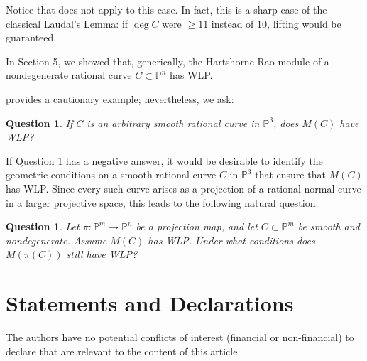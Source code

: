 \documentclass[12pt]{amsart}%
\numberwithin{equation}{section}
\newtheorem{question}[theorem]{Question}
\theoremstyle{definition}
\numberwithin{equation}{section}
\newcommand{\PP}{ \ensuremath{\mathbb{P}}}
\begin{document}
{Notice that  does not apply to this case. In fact, this is a sharp case of the classical Laudal’s Lemma: if $\deg C$ were $\geq 11$ instead of $10$, lifting would be guaranteed. 

In Section 5, we showed that, generically, the Hartshorne-Rao module of a nondegenerate rational curve $C\subset \PP^n$ has WLP. {  provides a cautionary example; nevertheless, we ask:

\begin{question} \label{Qratl}
    If $C$ is an arbitrary smooth rational curve in $\mathbb P^3$, does $M(C)$ have WLP?
\end{question}
}


If Question \ref{Qratl} has a negative answer, it would be desirable to identify the geometric conditions on a smooth rational curve $C$ in $\mathbb P^3$ that ensure that $M(C)$ has WLP. Since every such curve arises as a projection of a rational normal curve in a larger projective space, this leads to the following natural question. 

\begin{question}
    Let $\pi\colon \PP^m\to \PP^n$ be a projection map, and let $C\subset \PP^m$ be smooth and nondegenerate. Assume $M(C)$ has WLP. Under what conditions does $M(\pi(C))$ still have WLP?
\end{question}

}





\section*{ Statements and Declarations}

 The authors have no  potential conflicts 
of interest (financial or non-financial) to declare that are relevant to the content of this article.
\end{document}
